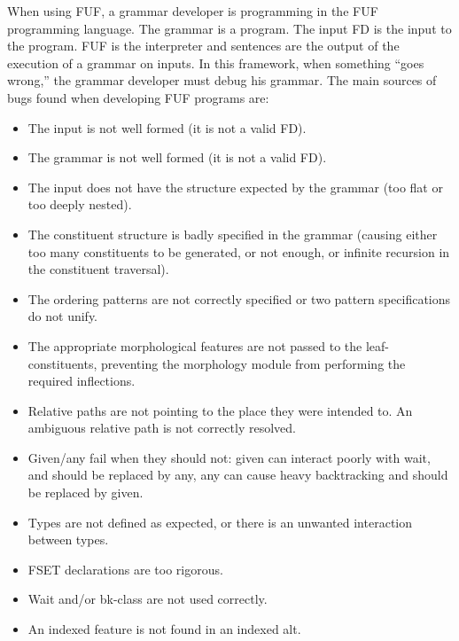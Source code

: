 \documentclass[10pt,a4paper]{report}
\begin{document}
When using FUF, a grammar developer is programming in the FUF programming
language.  The grammar is a program.  The input FD is the input to the
program.  FUF is the interpreter and sentences are the output of the
execution of a grammar on inputs.  In this framework, when something ``goes
wrong,'' the grammar developer must debug his grammar.  The main sources of
bugs found when developing FUF programs are:
\begin{itemize}
\item The input is not well formed (it is not a valid FD).

\item The grammar is not well formed (it is not a valid FD).

\item The input does not have the structure expected by the grammar (too flat or
too deeply nested).

\item The constituent structure is badly specified in the grammar (causing either
too many constituents to be generated, or not enough, or infinite recursion
in the constituent traversal).

\item The ordering patterns are not correctly specified or two pattern
specifications do not unify. 

\item The appropriate morphological features are not passed to the
leaf-constituents, preventing the morphology module from performing the
required inflections.

\item Relative paths are not pointing to the place they were intended to.
An ambiguous relative path is not correctly resolved.

\item Given/any fail when they should not: given can interact poorly with wait,
and should be replaced by any, any can cause heavy backtracking and should
be replaced by given.

\item Types are not defined as expected, or there is an unwanted interaction
between types. 

\item FSET declarations are too rigorous.

\item Wait and/or bk-class are not used correctly.

\item An indexed feature is not found in an indexed alt.
\end{itemize}
\end{document}

